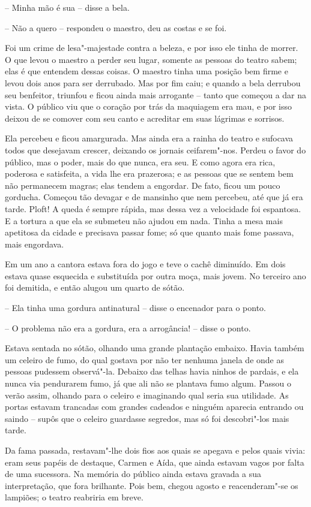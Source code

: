 -- Minha mão é sua -- disse a bela.

-- Não a quero -- respondeu o maestro, deu as costas e se foi.

Foi um crime de lesa"-majestade contra a beleza, e por isso ele tinha de
morrer. O que levou o maestro a perder seu lugar, somente as pessoas do
teatro sabem; elas é que entendem dessas coisas. O maestro tinha uma
posição bem firme e levou dois anos para ser derrubado. Mas por fim
caiu; e quando a bela derrubou seu benfeitor, triunfou e ficou ainda
mais arrogante -- tanto que começou a dar na vista. O público viu que o
coração por trás da maquiagem era mau, e por isso deixou de se comover
com seu canto e acreditar em suas lágrimas e sorrisos.

Ela percebeu e ficou amargurada. Mas ainda era a rainha do teatro e
sufocava todos que desejavam crescer, deixando os jornais
ceifarem"-nos. Perdeu o favor do público, mas o poder, mais do que
nunca, era seu. E como agora era rica, poderosa e satisfeita, a vida
lhe era prazerosa; e as pessoas que se sentem bem não permanecem
magras; elas tendem a engordar. De fato, ficou um pouco gorducha.
Começou tão devagar e de mansinho que nem percebeu, até que já era
tarde. Ploft! A queda é sempre rápida, mas dessa vez a velocidade foi
espantosa. E a tortura a que ela se submeteu não ajudou em nada. Tinha
a mesa mais apetitosa da cidade e precisava passar fome; só que quanto
mais fome passava, mais engordava. 

Em um ano a cantora estava fora do jogo e teve o cachê diminuído. Em
dois estava quase esquecida e substituída por outra moça, mais jovem.
No terceiro ano foi demitida, e então alugou um quarto de sótão.

-- Ela tinha uma gordura antinatural -- disse o encenador para o ponto.

-- O problema não era a gordura, era a arrogância! -- disse o ponto.
\asterisc

Estava sentada no sótão, olhando uma grande plantação embaixo. Havia
também um celeiro de fumo, do qual gostava por não ter nenhuma janela
de onde as pessoas pudessem observá"-la. Debaixo das telhas havia
ninhos de pardais, e ela nunca via pendurarem fumo, já que ali não se
plantava fumo algum. Passou o verão assim, olhando para o celeiro e
imaginando qual seria sua utilidade. As portas estavam trancadas com
grandes cadeados e ninguém aparecia entrando ou saindo -- supôs que o
celeiro guardasse segredos, mas só foi descobri"-los mais tarde.

Da fama passada, restavam"-lhe dois fios aos quais se apegava e pelos
quais vivia: eram seus papéis de destaque, Carmen e Aída, que ainda
estavam vagos por falta de uma sucessora. Na memória do público ainda
estava gravada a sua interpretação, que fora brilhante. Pois bem,
chegou agosto e reacenderam"-se os lampiões; o teatro reabriria em
breve.

